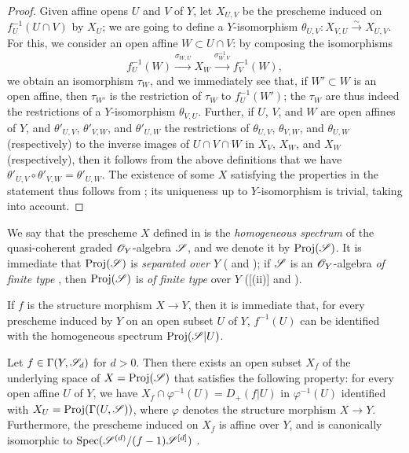 \begin{proof}
Given affine opens $U$ and $V$ of $Y$, let $X_{U,V}$ be the prescheme induced on $f_U^{-1}(U\cap V)$ by $X_U$;
we are going to define a $Y$-isomorphism $\theta_{U,V}:X_{V,U}\xrightarrow{\sim}X_{U,V}$.
For this, we consider an open affine $W\subset U\cap V$:
by composing the isomorphisms
\[
  f_U^{-1}(W)
  \xrightarrow{\sigma_{W,U}} X_W
  \xrightarrow{\sigma_{W,V}^{-1}} f_V^{-1}(W),
\]
we obtain an isomorphism $\tau_W$, and we immediately see that, if $W'\subset W$ is an open affine, then $\tau_{W'}$ is the restriction of $\tau_W$ to $f_U^{-1}(W')$;
the $\tau_W$ are thus indeed the restrictions of a $Y$-isomorphism $\theta_{V,U}$.
Further, if $U$, $V$, and $W$ are open affines of $Y$, and $\theta'_{U,V}$, $\theta'_{V,W}$, and $\theta'_{U,W}$ the restrictions of $\theta_{U,V}$, $\theta_{V,W}$, and $\theta_{U,W}$ (respectively) to the inverse images of $U\cap V\cap W$ in $X_V$, $X_W$, and $X_W$ (respectively), then it follows from the above definitions that we have $\theta'_{U,V}\circ\theta'_{V,W}=\theta'_{U,W}$.
The existence of some $X$ satisfying the properties in the statement thus follows from ;
its uniqueness up to $Y$-isomorphism is trivial, taking  into account.
\end{proof}

\begin{env}[3.1.3]
\label{II.3.1.3}
We say that the prescheme $X$ defined in  is the \emph{homogeneous spectrum} of the quasi-coherent graded $\mathscr{O}_Y$-algebra $\mathscr{S}$, and we denote it by $\operatorname{Proj}(\mathscr{S})$.
It is immediate that $\operatorname{Proj}(\mathscr{S})$ is \emph{separated over $Y$} ( and );
if $\mathscr{S}$ is an $\mathscr{O}_Y$-algebra \emph{of finite type} , then $\operatorname{Proj}(\mathscr{S})$ is \emph{of finite type} over $Y$ ([(ii)] and ).

If $f$ is the structure morphism $X\to Y$, then it is immediate that, for every prescheme induced by $Y$ on an open subset $U$ of $Y$, $f^{-1}(U)$ can be identified with the homogeneous spectrum $\operatorname{Proj}(\mathscr{S}|U)$.
\end{env}

\begin{proposition}[3.1.4]
\label{II.3.1.4}
Let $f\in\Gamma(Y,\mathscr{S}_d)$ for $d>0$.
Then there exists an open subset $X_f$ of the underlying space of $X=\operatorname{Proj}(\mathscr{S})$ that satisfies the following property:
for every open affine $U$ of $Y$, we have $X_f\cap\varphi^{-1}(U)=D_+(f|U)$ in $\varphi^{-1}(U)$ identified with $X_U=\operatorname{Proj}(\Gamma(U,\mathscr{S}))$, where $\varphi$ denotes the structure morphism $X\to Y$.
Furthermore, the prescheme induced on $X_f$ is affine over $Y$, and is canonically isomorphic to $\operatorname{Spec}(\mathscr{S}^{(d)}/(f-1)\mathscr{S}^{[d]})$ .
\end{proposition}

